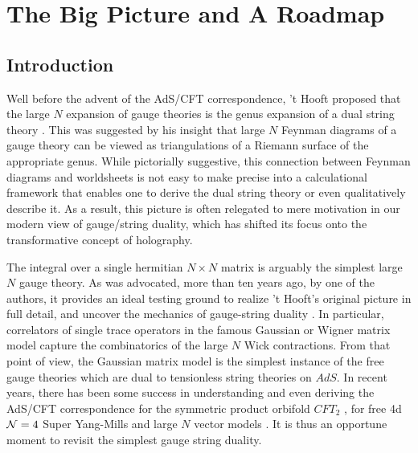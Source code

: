 \documentclass[english]{article}
\begin{document}
\pagebreak

\tableofcontents

\pagebreak


\section{The Big Picture and A Roadmap} \label{sec:bigpicture}

\subsection{Introduction}
Well before the advent of the AdS/CFT correspondence, 't Hooft proposed that the large $N$ expansion of gauge theories is the genus expansion of a dual string theory \cite{tHooftPlanar}. This was suggested by his insight that large $N$  Feynman diagrams of a gauge theory can be viewed as triangulations of a Riemann surface of the appropriate genus. While pictorially suggestive, this connection between Feynman diagrams and worldsheets is not easy to make precise into a calculational framework that enables one to derive the dual string theory or even qualitatively describe it. As a result, this picture is often relegated to mere motivation in our modern view of gauge/string duality, which has shifted its focus onto the transformative concept of holography.  

The integral over a single hermitian $N \times N$ matrix is arguably the simplest large $N$ gauge theory. As was advocated, more than ten years ago, by one of the authors, it provides an ideal testing ground to realize 't Hooft's original picture in full detail, and uncover the mechanics of gauge-string duality \cite{gopakumar2011simplest, gopakumar2013correlators}. In particular, correlators of single trace operators in the famous Gaussian or Wigner matrix model capture the combinatorics of the large $N$ Wick contractions. From that point of view, the Gaussian matrix model is the simplest instance of the free gauge theories which are dual to tensionless string theories on $AdS$. In recent years, there has been some success in understanding and even deriving the AdS/CFT correspondence for the symmetric product orbifold $CFT_2$ \cite{Gaberdiel:2018rqv, eberhardt2020deriving,eberhardt2019worldsheet,dei2021free}, for free 4d ${\cal N}=4$ Super Yang-Mills \cite{gaberdiel2021string,gaberdiel2021worldsheet} and large $N$ vector models \cite{Aharony:2020omh}. It is thus an opportune moment to revisit the simplest gauge string duality.
\end{document}

